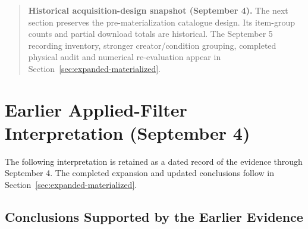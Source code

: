 \documentclass[11pt,a4paper]{article}
\begin{document}












\begin{quote}\textbf{Historical acquisition-design snapshot (September 4).} The next section preserves the pre-materialization catalogue design. Its item-group counts and partial download totals are historical. The September 5 recording inventory, stronger creator/condition grouping, completed physical audit and numerical re-evaluation appear in Section~\ref{sec:expanded-materialized}.\end{quote}



\section{Earlier Applied-Filter Interpretation (September 4)}
\label{sec:conclusion}

\noindent The following interpretation is retained as a dated record of the evidence through September 4. The completed expansion and updated conclusions follow in Section~\ref{sec:expanded-materialized}.

\subsection{Conclusions Supported by the Earlier Evidence}
\end{document}
